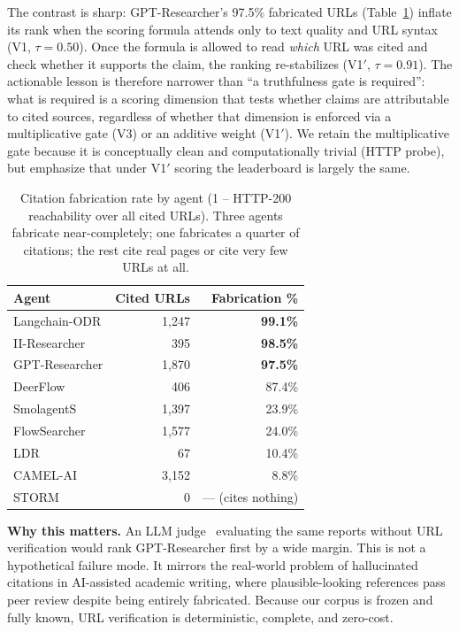 \documentclass{article}
\begin{document}
The contrast is sharp: GPT-Researcher's 97.5\% fabricated URLs (Table~\ref{tab:fab}) inflate its rank when the scoring formula attends only to text quality and URL syntax (V1, $\tau{=}0.50$). Once the formula is allowed to read \emph{which} URL was cited and check whether it supports the claim, the ranking re-stabilizes (V1$'$, $\tau{=}0.91$). The actionable lesson is therefore narrower than ``a truthfulness gate is required'': what is required is a scoring dimension that tests whether claims are attributable to cited sources, regardless of whether that dimension is enforced via a multiplicative gate (V3) or an additive weight (V1$'$). We retain the multiplicative gate because it is conceptually clean and computationally trivial (HTTP probe), but emphasize that under V1$'$ scoring the leaderboard is largely the same.

\begin{table}[t]
\centering
\caption{Citation fabrication rate by agent (1 -- HTTP-200 reachability over all cited URLs). Three agents fabricate near-completely; one fabricates a quarter of citations; the rest cite real pages or cite very few URLs at all.}
\label{tab:fab}
\vspace{1mm}
\small
\begin{tabular}{@{}lrr@{}}
\toprule
\textbf{Agent} & \textbf{Cited URLs} & \textbf{Fabrication \%} \\
\midrule
Langchain-ODR    & 1{,}247 & \textbf{99.1\%} \\
II-Researcher    &   395 & \textbf{98.5\%} \\
GPT-Researcher   & 1{,}870 & \textbf{97.5\%} \\
DeerFlow         &   406 & 87.4\% \\
SmolagentS       & 1{,}397 & 23.9\% \\
FlowSearcher     & 1{,}577 & 24.0\% \\
LDR              &    67 & 10.4\% \\
CAMEL-AI         & 3{,}152 & \phantom{0}8.8\% \\
STORM            &     0 & --- (cites nothing) \\
\bottomrule
\end{tabular}
\end{table}

\textbf{Why this matters.} An LLM judge~\citep{llmjudge2024} evaluating the same reports without URL verification would rank GPT-Researcher first by a wide margin. This is not a hypothetical failure mode. It mirrors the real-world problem of hallucinated citations in AI-assisted academic writing, where plausible-looking references pass peer review despite being entirely fabricated. Because our corpus is frozen and fully known, URL verification is deterministic, complete, and zero-cost.
\end{document}
